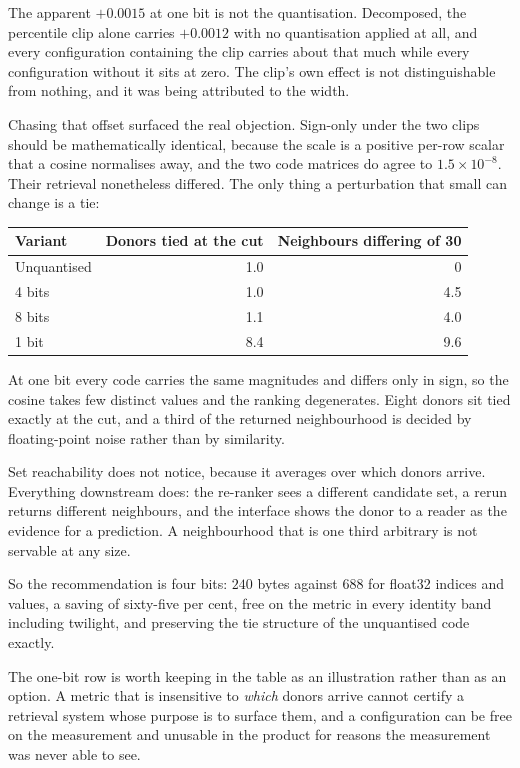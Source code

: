 The apparent $+0.0015$ at one bit is not the quantisation. Decomposed, the
percentile clip alone carries $+0.0012$ with no quantisation applied at
all, and every configuration containing the clip carries about that much
while every configuration without it sits at zero. The clip's own effect
is not distinguishable from nothing, and it was being attributed to the
width.

Chasing that offset surfaced the real objection. Sign-only under the two
clips should be mathematically identical, because the scale is a positive
per-row scalar that a cosine normalises away, and the two code matrices do
agree to $1.5 \times 10^{-8}$. Their retrieval nonetheless differed. The
only thing a perturbation that small can change is a tie:

\begin{center}
\begin{tabular}{lrr}
\toprule
Variant & Donors tied at the cut & Neighbours differing of 30 \\
\midrule
Unquantised & 1.0 & 0 \\
4 bits & 1.0 & 4.5 \\
8 bits & 1.1 & 4.0 \\
1 bit & 8.4 & 9.6 \\
\bottomrule
\end{tabular}
\end{center}

At one bit every code carries the same magnitudes and differs only in
sign, so the cosine takes few distinct values and the ranking degenerates.
Eight donors sit tied exactly at the cut, and a third of the returned
neighbourhood is decided by floating-point noise rather than by
similarity.

Set reachability does not notice, because it averages over which donors
arrive. Everything downstream does: the re-ranker sees a different
candidate set, a rerun returns different neighbours, and the interface
shows the donor to a reader as the evidence for a prediction. A
neighbourhood that is one third arbitrary is not servable at any size.

So the recommendation is four bits: $240$ bytes against $688$ for float32
indices and values, a saving of sixty-five per cent, free on the metric in
every identity band including twilight, and preserving the tie structure
of the unquantised code exactly.

The one-bit row is worth keeping in the table as an illustration rather
than as an option. A metric that is insensitive to \emph{which} donors
arrive cannot certify a retrieval system whose purpose is to surface them,
and a configuration can be free on the measurement and unusable in the
product for reasons the measurement was never able to see.

